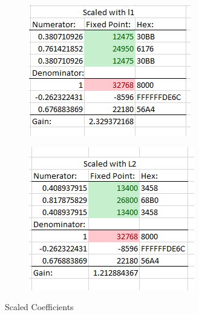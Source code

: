\documentclass[12pt,a4paper,titlepage]{article}
\begin{document}
\begin{figure}[!htb]
  \centering
  \begin{subfigure}[b]{0.4\textwidth}
    \includegraphics[width=\textwidth]
                    {../presentation/scaled-with-l1.png}
  \end{subfigure}
  \begin{subfigure}[b]{0.4\textwidth}
    \includegraphics[width=\textwidth]
                    {../presentation/scaled-with-L2.png}
  \end{subfigure}
  \caption{Scaled Coefficients}
\end{figure}
\end{document}
